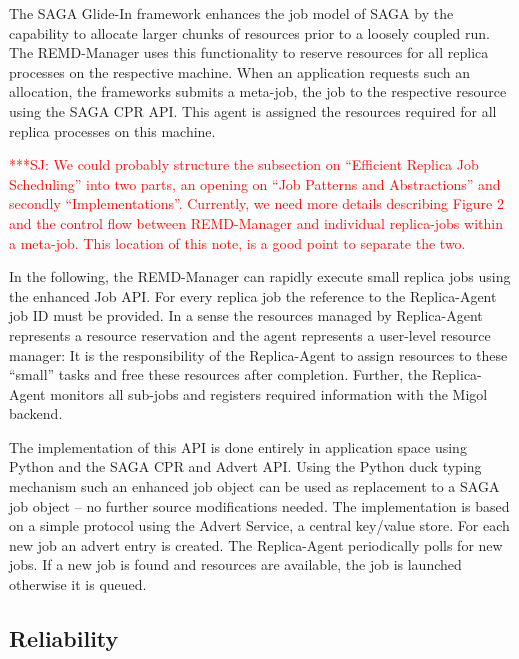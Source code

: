 \documentclass{rspublic}
\newcommand{\jhanote}[1]{ {\textcolor{red} { ***SJ: #1 }}}
\newcommand{\jhanote}[1]{}
\newcommand{\glidein}[1]{Glide-In }
\newcommand{\replicaagent}[1]{Replica-Agent }
\begin{document}
The SAGA \glidein\ framework enhances the job model of SAGA by the
capability to allocate larger chunks of resources prior to a loosely
coupled run. The REMD-Manager uses this functionality to reserve
resources for all replica processes on the respective machine.  When
an application requests such an allocation, the frameworks submits a
meta-job, the \textit{\replicaagent} job to the respective resource
using the SAGA CPR API. This agent is assigned the resources required
for all replica processes on this machine.

\jhanote{We could probably structure the subsection on ``Efficient
  Replica Job Scheduling'' into two parts, an opening on ``Job
  Patterns and Abstractions'' and secondly
  ``Implementations''. Currently, we need more details describing
  Figure 2 and the control flow between REMD-Manager and individual
  replica-jobs within a meta-job. This location of this note, is a
  good point to separate the two.}

In the following, the REMD-Manager can rapidly execute small replica
jobs using the enhanced Job API. For every replica job the reference
to the \replicaagent\ job ID must be provided. In a sense the
resources managed by \replicaagent\ represents a resource reservation
and the agent represents a user-level resource manager: It is the
responsibility of the \replicaagent\ to assign resources to these
``small'' tasks and free these resources after completion. Further,
the \replicaagent\ monitors all sub-jobs and registers required
information with the Migol backend.



The implementation of this API is done entirely in application space
using Python and the SAGA CPR and Advert API. Using the Python duck
typing mechanism such an enhanced job object can be used as
replacement to a SAGA job object -- no further source modifications
needed. The implementation is based on a simple protocol using the
Advert Service, a central key/value store.  For each new job an advert
entry is created. The \replicaagent\ periodically polls for new jobs.
If a new job is found and resources are available, the job is launched
otherwise it is queued.

\subsection{Reliability}
                                                                
\end{document}
